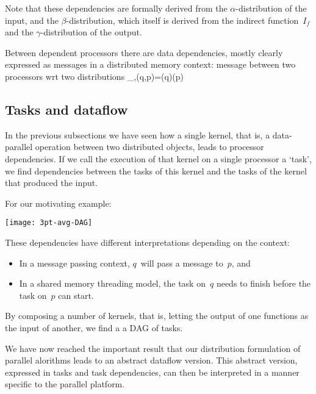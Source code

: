 Note that these dependencies are formally derived from the $\alpha$-distribution
of the input, and the $\beta$-distribution, which itself is derived
from the indirect function~$I_f$ and the $\gamma$-distribution of the output.

Between dependent processors there are data dependencies, mostly clearly
expressed as messages in a distributed memory context:
%
    {message between two processors wrt two distributions}
    {_{\alpha,\beta}(q,p)=\alpha(q)\cap \beta(p)}

\subsection{Tasks and dataflow}
\label{sec:dataflow}

In the previous subsections we have seen how a single kernel,
that is, a data-parallel operation between two distributed objects,
leads to processor dependencies. If we call the execution of
that kernel on a single processor a `task', we find
dependencies between the tasks of this kernel and
the tasks of the kernel that produced the input.

For our motivating example:

\texttt{[image: 3pt-avg-DAG]}

These dependencies have different interpretations depending on the context:
\begin{itemize}
\item In a message passing context, $q$~will pass a message to~$p$,
  and
\item In a shared memory threading model, the task on~$q$ needs to
  finish before the task on~$p$ can start.
\end{itemize}
By composing a number of kernels, that is, letting the output of one
functions as the input of another, we find a a DAG of tasks.

We have now reached the important result that our distribution
formulation of parallel alorithms leads to an abstract dataflow
version. This abstract version, expressed in tasks and task dependencies,
can then be interpreted in a manner specific to the parallel platform.

